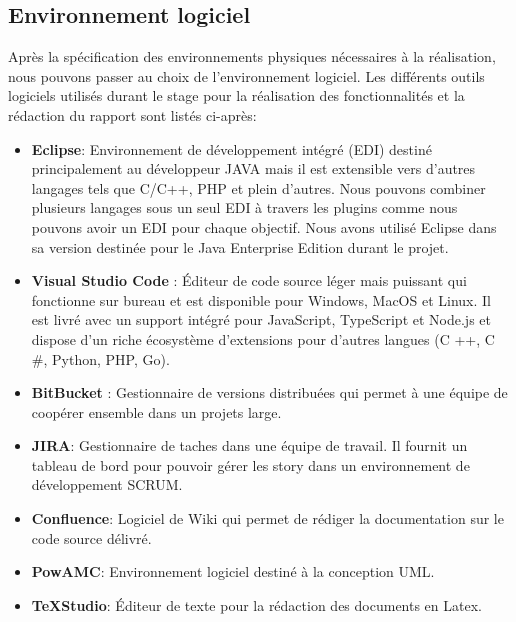 \subsection{Environnement logiciel}

\qquad Après la spécification des environnements physiques nécessaires à la réalisation, nous pouvons passer au choix de l'environnement logiciel. Les différents outils logiciels utilisés durant le stage pour la réalisation des fonctionnalités et la rédaction du rapport sont listés ci-après: 

\begin{itemize}
	\item \textbf{Eclipse}: Environnement de développement intégré (EDI) destiné principalement au développeur JAVA mais il est extensible vers d'autres langages tels que C/C++, PHP et plein d'autres. Nous pouvons combiner plusieurs langages sous un seul EDI à travers les plugins comme nous pouvons avoir un EDI pour chaque objectif. Nous avons utilisé Eclipse dans sa version destinée pour le Java Enterprise Edition durant le projet.
	
	\item \textbf{Visual Studio Code} : Éditeur de code source léger mais puissant qui fonctionne sur bureau et est disponible pour Windows, MacOS et Linux. Il est livré avec un support intégré pour JavaScript, TypeScript et Node.js et dispose d'un riche écosystème d'extensions pour d'autres langues (C ++, C \#, Python, PHP, Go).
	
	\item \textbf{BitBucket} : Gestionnaire de versions distribuées qui permet à une équipe de coopérer ensemble dans un projets large.
	
	\item \textbf{JIRA}: Gestionnaire de taches dans une équipe de travail. Il fournit un tableau de bord pour pouvoir gérer les story dans un environnement de développement SCRUM.
	
	\item \textbf{Confluence}: Logiciel de Wiki qui permet de rédiger la documentation sur le code source délivré.
	
	\item \textbf{PowAMC}: Environnement logiciel destiné à la conception UML. 
	
	\item \textbf{TeXStudio}: Éditeur de texte pour la rédaction des documents en Latex.
\end{itemize}

